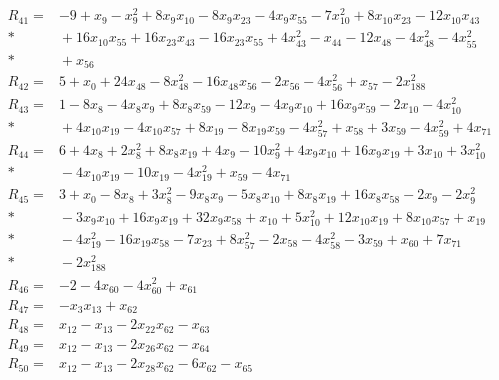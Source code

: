 \documentclass[11pt]{article}
\theoremstyle{remark}\newtheorem{remark}[theorem]{Remark}
\begin{document}
\begin{align*}
R_{41} ={}& -9 + x_{9} - x_{9}^{2} + 8x_{9}x_{10} - 8x_{9}x_{23} - 4x_{9}x_{55} - 7x_{10}^{2} + 8x_{10}x_{23} - 12x_{10}x_{43} \\*
&{} + 16x_{10}x_{55} + 16x_{23}x_{43} - 16x_{23}x_{55} + 4x_{43}^{2} - x_{44} - 12x_{48} - 4x_{48}^{2} - 4x_{55}^{2} \\*
&{} + x_{56} \\[4pt]
R_{42} ={}& 5 + x_{0} + 24x_{48} - 8x_{48}^{2} - 16x_{48}x_{56} - 2x_{56} - 4x_{56}^{2} + x_{57} - 2x_{188}^{2} \\[4pt]
R_{43} ={}& 1 - 8x_{8} - 4x_{8}x_{9} + 8x_{8}x_{59} - 12x_{9} - 4x_{9}x_{10} + 16x_{9}x_{59} - 2x_{10} - 4x_{10}^{2} \\*
&{} + 4x_{10}x_{19} - 4x_{10}x_{57} + 8x_{19} - 8x_{19}x_{59} - 4x_{57}^{2} + x_{58} + 3x_{59} - 4x_{59}^{2} + 4x_{71} \\[4pt]
R_{44} ={}& 6 + 4x_{8} + 2x_{8}^{2} + 8x_{8}x_{19} + 4x_{9} - 10x_{9}^{2} + 4x_{9}x_{10} + 16x_{9}x_{19} + 3x_{10} + 3x_{10}^{2} \\*
&{} - 4x_{10}x_{19} - 10x_{19} - 4x_{19}^{2} + x_{59} - 4x_{71} \\[4pt]
R_{45} ={}& 3 + x_{0} - 8x_{8} + 3x_{8}^{2} - 9x_{8}x_{9} - 5x_{8}x_{10} + 8x_{8}x_{19} + 16x_{8}x_{58} - 2x_{9} - 2x_{9}^{2} \\*
&{} - 3x_{9}x_{10} + 16x_{9}x_{19} + 32x_{9}x_{58} + x_{10} + 5x_{10}^{2} + 12x_{10}x_{19} + 8x_{10}x_{57} + x_{19} \\*
&{} - 4x_{19}^{2} - 16x_{19}x_{58} - 7x_{23} + 8x_{57}^{2} - 2x_{58} - 4x_{58}^{2} - 3x_{59} + x_{60} + 7x_{71} \\*
&{} - 2x_{188}^{2} \\[4pt]
R_{46} ={}& -2 - 4x_{60} - 4x_{60}^{2} + x_{61} \\[4pt]
R_{47} ={}& -x_{3}x_{13} + x_{62} \\[4pt]
R_{48} ={}& x_{12} - x_{13} - 2x_{22}x_{62} - x_{63} \\[4pt]
R_{49} ={}& x_{12} - x_{13} - 2x_{26}x_{62} - x_{64} \\[4pt]
R_{50} ={}& x_{12} - x_{13} - 2x_{28}x_{62} - 6x_{62} - x_{65} \\[4pt]

\end{align*}
\end{document}
